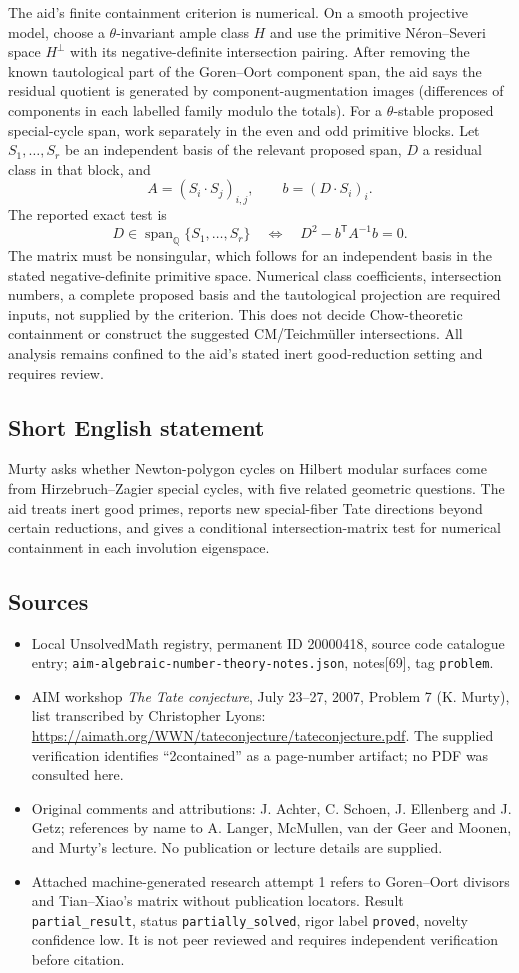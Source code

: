 \documentclass[11pt]{article}
\newcommand{\Q}{\mathbb{Q}}
\begin{document}
The aid's finite containment criterion is numerical. On a smooth projective model, choose a $\theta$-invariant ample class $H$ and use the primitive Néron--Severi space $H^\perp$ with its negative-definite intersection pairing. After removing the known tautological part of the Goren--Oort component span, the aid says the residual quotient is generated by component-augmentation images (differences of components in each labelled family modulo the totals). For a $\theta$-stable proposed special-cycle span, work separately in the even and odd primitive blocks. Let $S_1,\ldots,S_r$ be an independent basis of the relevant proposed span, $D$ a residual class in that block, and
\[A=(S_i\cdot S_j)_{i,j},\qquad b=(D\cdot S_i)_i.\]
The reported exact test is
\[D\in\operatorname{span}_{\Q}\{S_1,\ldots,S_r\}\quad\Longleftrightarrow\quad D^2-b^{\mathsf T}A^{-1}b=0.\]
The matrix must be nonsingular, which follows for an independent basis in the stated negative-definite primitive space. Numerical class coefficients, intersection numbers, a complete proposed basis and the tautological projection are required inputs, not supplied by the criterion. This does not decide Chow-theoretic containment or construct the suggested CM/Teichmüller intersections. All analysis remains confined to the aid's stated inert good-reduction setting and requires review.
\subsection{Short English statement}
Murty asks whether Newton-polygon cycles on Hilbert modular surfaces come from Hirzebruch--Zagier special cycles, with five related geometric questions. The aid treats inert good primes, reports new special-fiber Tate directions beyond certain reductions, and gives a conditional intersection-matrix test for numerical containment in each involution eigenspace.
\subsection{Sources}
\begin{itemize}
\item Local UnsolvedMath registry, permanent ID 20000418, source code catalogue entry; \texttt{aim-algebraic-number-theory-notes.json}, notes[69], tag \texttt{problem}.
\item AIM workshop \emph{The Tate conjecture}, July 23--27, 2007, Problem 7 (K. Murty), list transcribed by Christopher Lyons: \url{https://aimath.org/WWN/tateconjecture/tateconjecture.pdf}. The supplied verification identifies ``2contained'' as a page-number artifact; no PDF was consulted here.
\item Original comments and attributions: J. Achter, C. Schoen, J. Ellenberg and J. Getz; references by name to A. Langer, McMullen, van der Geer and Moonen, and Murty's lecture. No publication or lecture details are supplied.
\item Attached machine-generated research attempt 1 refers to Goren--Oort divisors and Tian--Xiao's matrix without publication locators. Result \texttt{partial\_result}, status \texttt{partially\_solved}, rigor label \texttt{proved}, novelty confidence low. It is not peer reviewed and requires independent verification before citation.
\end{itemize}
\end{document}
